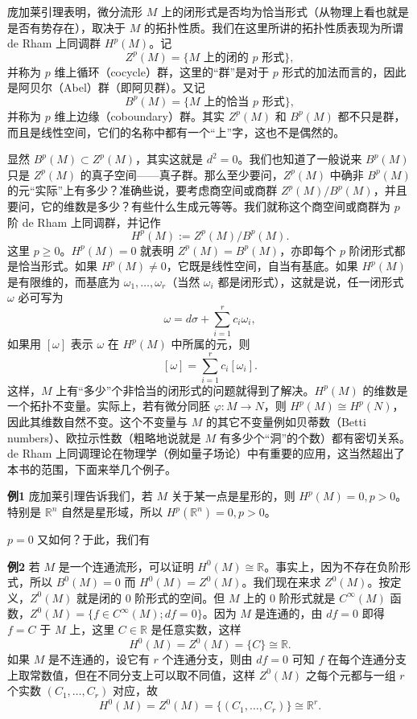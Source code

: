 庞加莱引理表明，微分流形 $M$ 上的闭形式是否均为恰当形式（从物理上看也就是是否有势存在），取决于 $M$ 的拓扑性质。我们在这里所讲的拓扑性质表现为所谓 de Rham 上同调群 $H^p(M)$。记
\[
 Z^p(M)=\{M\text{ 上的闭的 }p\text{ 形式}\},
\]
并称为 $p$ 维上循环（cocycle）群，这里的“群”是对于 $p$ 形式的加法而言的，因此是阿贝尔（Abel）群（即阿贝群）。又记
\[
 B^p(M)=\{M\text{ 上的恰当 }p\text{ 形式}\},
\]
并称为 $p$ 维上边缘（coboundary）群。其实 $Z^p(M)$ 和 $B^p(M)$ 都不只是群，而且是线性空间，它们的名称中都有一个“上”字，这也不是偶然的。

显然 $B^p(M)\subset Z^p(M)$，其实这就是 $d^2=0$。我们也知道了一般说来 $B^p(M)$ 只是 $Z^p(M)$ 的真子空间——真子群。那么至少要问，$Z^p(M)$ 中确非 $B^p(M)$ 的元“实际”上有多少？准确些说，要考虑商空间或商群 $Z^p(M)/B^p(M)$，并且要问，它的维数是多少？有些什么生成元等等。我们就称这个商空间或商群为 $p$ 阶 de Rham 上同调群，并记作
\[
 H^p(M):=Z^p(M)/B^p(M).
\]
这里 $p\ge0$。$H^p(M)=0$ 就表明 $Z^p(M)=B^p(M)$，亦即每个 $p$ 阶闭形式都是恰当形式。如果 $H^p(M)\ne0$，它既是线性空间，自当有基底。如果 $H^p(M)$ 是有限维的，而基底为 $\omega_1,\ldots,\omega_r$（当然 $\omega_i$ 都是闭形式），这就是说，任一闭形式 $\omega$ 必可写为
\[
 \omega=d\sigma+\sum_{i=1}^r c_i\omega_i,
\]
如果用 $[\omega]$ 表示 $\omega$ 在 $H^p(M)$ 中所属的元，则
\[
 [\omega]=\sum_{i=1}^r c_i[\omega_i].
\]
这样，$M$ 上有“多少”个非恰当的闭形式的问题就得到了解决。$H^p(M)$ 的维数是一个拓扑不变量。实际上，若有微分同胚 $\varphi:M\to N$，则 $H^p(M)\cong H^p(N)$，因此其维数自然不变。这个不变量与 $M$ 的其它不变量例如贝蒂数（Betti numbers）、欧拉示性数（粗略地说就是 $M$ 有多少个“洞”的个数）都有密切关系。de Rham 上同调理论在物理学（例如量子场论）中有重要的应用，这当然超出了本书的范围，下面来举几个例子。

\noindent\textbf{例1}\quad
庞加莱引理告诉我们，若 $M$ 关于某一点是星形的，则 $H^p(M)=0,p>0$。特别是 $\mathbb R^n$ 自然是星形域，所以 $H^p(\mathbb R^n)=0,p>0$。

$p=0$ 又如何？于此，我们有

\noindent\textbf{例2}\quad
若 $M$ 是一个连通流形，可以证明 $H^0(M)\cong\mathbb R$。事实上，因为不存在负阶形式，所以 $B^0(M)=0$ 而 $H^0(M)=Z^0(M)$。我们现在来求 $Z^0(M)$。按定义，$Z^0(M)$ 就是闭的 $0$ 阶形式的空间。但 $M$ 上的 $0$ 阶形式就是 $C^\infty(M)$ 函数，$Z^0(M)=\{f\in C^\infty(M);df=0\}$。因为 $M$ 是连通的，由 $df=0$ 即得 $f=C$ 于 $M$ 上，这里 $C\in\mathbb R$ 是任意实数，这样
\[
 H^0(M)=Z^0(M)=\{C\}\cong\mathbb R.
\]
如果 $M$ 是不连通的，设它有 $r$ 个连通分支，则由 $df=0$ 可知 $f$ 在每个连通分支上取常数值，但在不同分支上可以取不同值，这样 $Z^0(M)$ 之每个元都与一组 $r$ 个实数 $(C_1,\ldots,C_r)$ 对应，故
\[
 H^0(M)=Z^0(M)=\{(C_1,\ldots,C_r)\}\cong\mathbb R^r.
\]

